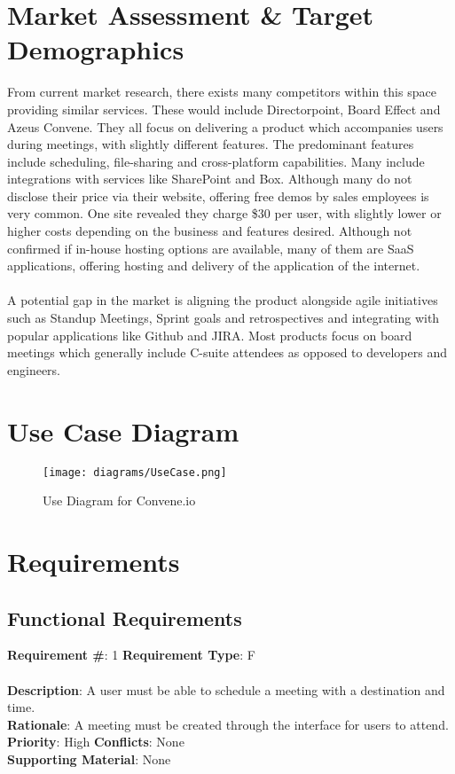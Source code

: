\documentclass[11pt, oneside]{article}
\begin{document}
\section{Market Assessment \& Target Demographics}
From current market research, there exists many competitors within this space providing similar services.  These would include Directorpoint, Board Effect and Azeus Convene. They all focus on delivering a product which accompanies users during meetings, with slightly different features. The predominant features include scheduling, file-sharing and cross-platform capabilities. Many include integrations with services like SharePoint and Box. Although many do not disclose their price via their website, offering free demos by sales employees is very common. One site revealed they charge \$30 per user, with slightly lower or higher costs depending on the business and features desired. Although not confirmed if in-house hosting options are available, many of them are SaaS applications, offering hosting and delivery of the application of the internet. \\\\
A potential gap in the market is aligning the product alongside agile initiatives such as Standup Meetings, Sprint goals and retrospectives and integrating with popular applications like Github and JIRA. Most products focus on board meetings which generally include C-suite attendees as opposed to developers and engineers.
\section{Use Case Diagram}
\begin{figure}[htbp!]
   \centering
   \texttt{[image: diagrams/UseCase.png]}
   \caption{Use Diagram for Convene.io}
   \label{fig:useCaseDiagram}
\end{figure}
\section{Requirements}
\subsection{Functional Requirements}

\begin{framed}
	\noindent\textbf{Requirement \#}: 1 \hfill \textbf{Requirement Type}: F \hfill\\\\
	\noindent\textbf{Description}: A user must be able to schedule a meeting with a destination and time. \\
	\textbf{Rationale}: A meeting must be created through the interface for users to attend. \\
	\textbf{Priority}: High \hfill \textbf{Conflicts}: None \hfill\\
	\textbf{Supporting Material}: None\\
\end{framed}
\end{document}
